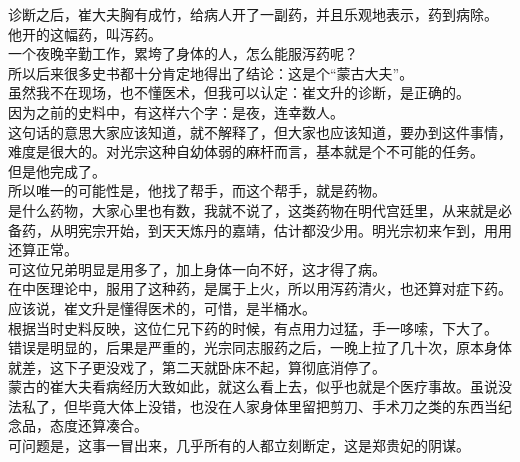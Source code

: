 \begin{multicols}{\theparacolNo}
诊断之后，崔大夫胸有成竹，给病人开了一副药，并且乐观地表示，药到病除。\\

他开的这幅药，叫泻药。\\

一个夜晚辛勤工作，累垮了身体的人，怎么能服泻药呢？\\

所以后来很多史书都十分肯定地得出了结论：这是个“蒙古大夫”。\\

虽然我不在现场，也不懂医术，但我可以认定：崔文升的诊断，是正确的。\\

因为之前的史料中，有这样六个字：是夜，连幸数人。\\

这句话的意思大家应该知道，就不解释了，但大家也应该知道，要办到这件事情，难度是很大的。对光宗这种自幼体弱的麻杆而言，基本就是个不可能的任务。\\

但是他完成了。\\

所以唯一的可能性是，他找了帮手，而这个帮手，就是药物。\\

是什么药物，大家心里也有数，我就不说了，这类药物在明代宫廷里，从来就是必备药，从明宪宗开始，到天天炼丹的嘉靖，估计都没少用。明光宗初来乍到，用用还算正常。\\

可这位兄弟明显是用多了，加上身体一向不好，这才得了病。\\

在中医理论中，服用了这种药，是属于上火，所以用泻药清火，也还算对症下药。\\

应该说，崔文升是懂得医术的，可惜，是半桶水。\\

根据当时史料反映，这位仁兄下药的时候，有点用力过猛，手一哆嗦，下大了。\\

错误是明显的，后果是严重的，光宗同志服药之后，一晚上拉了几十次，原本身体就差，这下子更没戏了，第二天就卧床不起，算彻底消停了。\\

蒙古的崔大夫看病经历大致如此，就这么看上去，似乎也就是个医疗事故。虽说没法私了，但毕竟大体上没错，也没在人家身体里留把剪刀、手术刀之类的东西当纪念品，态度还算凑合。\\

可问题是，这事一冒出来，几乎所有的人都立刻断定，这是郑贵妃的阴谋。\\


\end{multicols}
